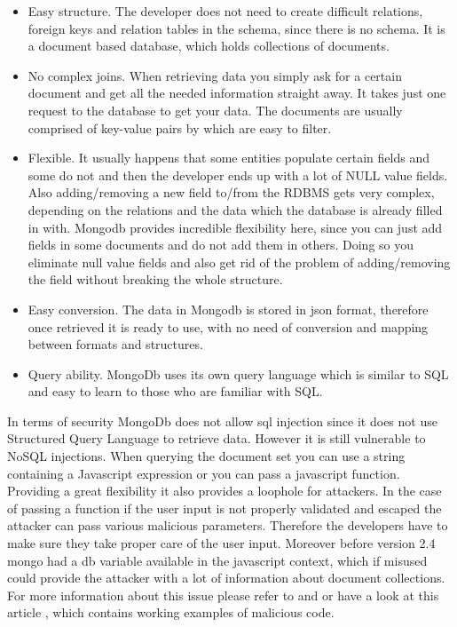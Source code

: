 \documentclass[thesis=M,english]{FITthesis}[2012/10/20]
\begin{document}
\begin{itemize}
\item{Easy structure.} The developer does not need to create difficult relations, foreign keys and relation tables in the schema, since there is no schema. It is a document based database, which holds collections of documents.\cite{mongo-docs}

\item{No complex joins.} When retrieving data you simply ask for a certain document and get all the needed information straight away. It takes just one request to the database to get your data. The documents are usually comprised of key-value pairs by which  are easy to filter.\cite{mongo-docs}\cite{mongo-article2}

\item{Flexible.} It usually happens that some entities populate certain fields and some do not and then the developer ends up with a lot of NULL value fields. Also adding/removing a new field to/from the RDBMS gets very complex, depending on the relations and the data which the database is already filled in with. Mongodb provides incredible flexibility here, since you can just add fields in some documents and do not add them in others. Doing so you eliminate null value fields and also get rid of the problem of adding/removing the field without breaking the whole structure. \cite{mongo-article2}

\item{Easy conversion.} The data in Mongodb is stored in json format, therefore once retrieved it is ready to use, with no need of conversion and mapping between formats and structures.\cite{mongo-docs}

\item{Query ability.} MongoDb uses its own query language which is similar to SQL and easy to learn to those who are familiar with SQL. \cite{mongo-docs}
\end{itemize}

In terms of security MongoDb does not allow sql injection since it does not use Structured Query Language to retrieve data. However it is still vulnerable to NoSQL injections. When querying the document set you can use a string containing a Javascript expression or you can pass a javascript function. Providing a great flexibility it also provides a loophole for attackers. In the case of passing a function if the user input is not properly validated and escaped the attacker can pass various malicious parameters. Therefore the developers have to make sure they take proper care of the user input. Moreover before version 2.4 mongo had a db variable available in the javascript context, which if misused could provide the attacker with a lot of information about document collections. For more information about this issue please refer to \cite{mongo-injection} and \cite{mongo-injection-docs} or have a look at this article \cite{mongo-article}, which contains working examples of malicious code.
\end{document}
